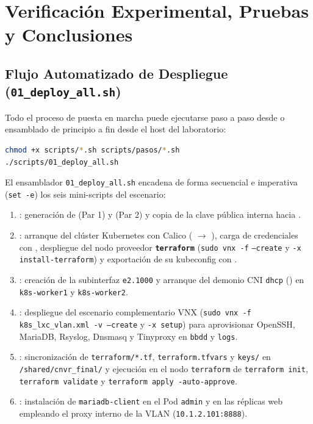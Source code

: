 \chapter{Verificación Experimental, Pruebas y Conclusiones}

\section{Flujo Automatizado de Despliegue (\texttt{01\_deploy\_all.sh})}

Todo el proceso de puesta en marcha puede ejecutarse paso a paso desde  o ensamblado de principio a fin desde el host del laboratorio:
\begin{lstlisting}[language=bash]
chmod +x scripts/*.sh scripts/pasos/*.sh
./scripts/01_deploy_all.sh
\end{lstlisting}

El ensamblador \texttt{01\_deploy\_all.sh} encadena de forma secuencial e imperativa (\texttt{set -e}) los seis mini-scripts del escenario:
\begin{enumerate}
  \item \textbf{}: generación de  (Par 1) y  (Par 2) y copia de la clave pública interna hacia .
  \item \textbf{}: arranque del clúster Kubernetes con Calico ( $\rightarrow$ ), carga de credenciales con , despliegue del nodo proveedor \textbf{\texttt{terraform}} (\texttt{sudo vnx -f}  \texttt{--create} y \texttt{-x install-terraform}) y exportación de su kubeconfig con .
  \item \textbf{}: creación de la subinterfaz \texttt{e2.1000} y arranque del demonio CNI \texttt{dhcp} () en \texttt{k8s-worker1} y \texttt{k8s-worker2}.
  \item \textbf{}: despliegue del escenario complementario VNX (\texttt{sudo vnx -f k8s\_lxc\_vlan.xml -v --create} y \texttt{-x setup}) para aprovisionar OpenSSH, MariaDB, Rsyslog, Dnsmasq y Tinyproxy en \texttt{bbdd} y \texttt{logs}.
  \item \textbf{}: sincronización de \texttt{terraform/*.tf}, \texttt{terraform.tfvars} y \texttt{keys/} en \texttt{/shared/cnvr\_final/} y ejecución en el nodo \texttt{terraform} de \texttt{terraform init}, \texttt{terraform validate} y \texttt{terraform apply -auto-approve}.
  \item \textbf{}: instalación de \texttt{mariadb-client} en el Pod \texttt{admin} y en las réplicas web empleando el proxy interno de la VLAN (\texttt{10.1.2.101:8888}).
\end{enumerate}

